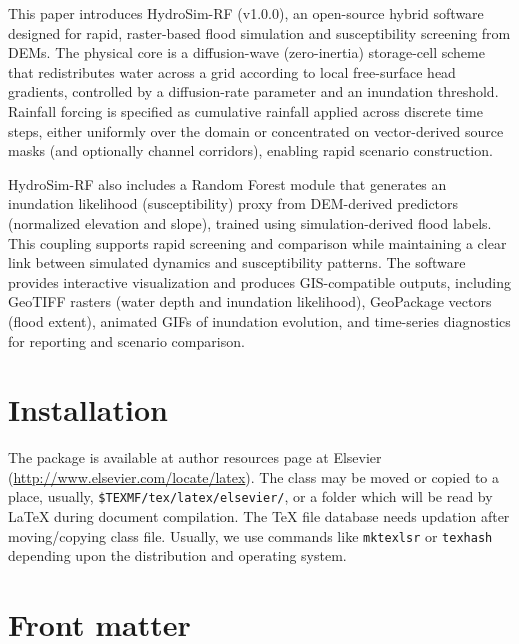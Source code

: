 \documentclass[a4paper,fleqn]{cas-dc}
\begin{document}
This paper introduces HydroSim-RF (v1.0.0), an open-source hybrid software designed for rapid, raster-based flood simulation and susceptibility screening from DEMs. The physical core is a diffusion-wave (zero-inertia) storage-cell scheme that redistributes water across a grid according to local free-surface head gradients, controlled by a diffusion-rate parameter and an inundation threshold. Rainfall forcing is specified as cumulative rainfall applied across discrete time steps, either uniformly over the domain or concentrated on vector-derived source masks (and optionally channel corridors), enabling rapid scenario construction.

HydroSim-RF also includes a Random Forest module that generates an inundation likelihood (susceptibility) proxy from DEM-derived predictors (normalized elevation and slope), trained using simulation-derived flood labels. This coupling supports rapid screening and comparison while maintaining a clear link between simulated dynamics and susceptibility patterns. The software provides interactive visualization and produces GIS-compatible outputs, including GeoTIFF rasters (water depth and inundation likelihood), GeoPackage vectors (flood extent), animated GIFs of inundation evolution, and time-series diagnostics for reporting and scenario comparison.


\section{Installation}

The package is available at author resources page at Elsevier
(\url{http://www.elsevier.com/locate/latex}).
The class may be moved or copied to a place, usually,\linebreak
\verb+$TEXMF/tex/latex/elsevier/+, %
or a folder which will be read                   
by \LaTeX{} during document compilation.  The \TeX{} file
database needs updation after moving/copying class file.  Usually,
we use commands like \verb+mktexlsr+ or \verb+texhash+ depending
upon the distribution and operating system.

\section{Front matter}
\end{document}
